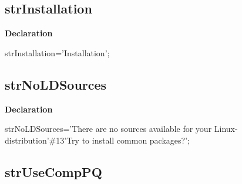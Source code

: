 \documentclass{report}
\newif\ifpdf
\begin{document}
\subsection*{strInstallation}
\fi
\label{trstrings-strInstallation}
\begin{list}{}{
\setlength{\itemindent}{0cm}
\setlength{\listparindent}{0cm}
\setlength{\leftmargin}{\evensidemargin}
\addtolength{\leftmargin}{\tmplength}
\settowidth{\labelsep}{X}
\addtolength{\leftmargin}{\labelsep}
\setlength{\labelwidth}{\tmplength}
}
\item[\textbf{Declaration}\hfill]
\ifpdf
\begin{flushleft}
\fi
\begin{ttfamily}
strInstallation='Installation';\end{ttfamily}

\ifpdf
\end{flushleft}
\fi

\end{list}
\ifpdf
\subsection*{\large{\textbf{strNoLDSources}}\normalsize\hspace{1ex}\hrulefill}
\else
\subsection*{strNoLDSources}
\fi
\label{trstrings-strNoLDSources}
\begin{list}{}{
\setlength{\itemindent}{0cm}
\setlength{\listparindent}{0cm}
\setlength{\leftmargin}{\evensidemargin}
\addtolength{\leftmargin}{\tmplength}
\settowidth{\labelsep}{X}
\addtolength{\leftmargin}{\labelsep}
\setlength{\labelwidth}{\tmplength}
}
\item[\textbf{Declaration}\hfill]
\ifpdf
\begin{flushleft}
\fi
\begin{ttfamily}
strNoLDSources='There are no sources available for your Linux-distribution'{\#}13'Try to install common packages?';\end{ttfamily}

\ifpdf
\end{flushleft}
\fi

\end{list}
\ifpdf
\subsection*{\large{\textbf{strUseCompPQ}}\normalsize\hspace{1ex}\hrulefill}
\else
\end{document}
